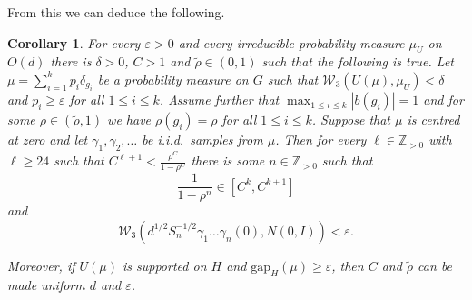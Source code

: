 \documentclass[10pt, english,oneside,reqno]{amsart}
\theoremstyle{plain}
\newtheorem{corollary}[theorem]{Corollary}
\theoremstyle{remark}
\numberwithin{equation}{section}
\numberwithin{figure}{section}
\newcommand{\eps}{\varepsilon}
\newcommand{\Z}{\mathbb{Z}}
\newcommand{\R}{\mathbb{R}}
\begin{document}
From this we can deduce the following.
\begin{corollary} \label{coro:many_bounded}
    For every $\varepsilon > 0$ and every irreducible probability measure $\mu_U$ on $O(d)$ there is $\delta > 0$,  $C>1$ and $\tilde{\rho} \in (0, 1)$ such that the following is true. Let $\mu = \sum_{i = 1}^k p_i\delta_{g_i}$ be a probability measure on $G$ such that $\mathcal{W}_3(U(\mu), \mu_U) < \delta$ and $p_i \geq \eps$ for all $1 \leq i \leq k$. Assume further that $\max_{1 \leq i \leq k} |b(g_i)| = 1$ and for some $\rho \in (\tilde{\rho},1)$ we have $\rho(g_i) = \rho$ for all $1\leq i \leq k$. Suppose that $\mu$ is centred at zero and let $\gamma_1, \gamma_2, \dots$ be i.i.d.\ samples from $\mu$. Then for every $\ell \in \Z_{>0}$ with $\ell \geq 24$ such that $C^{\ell+1} < \frac{\rho^{C}}{1 - \rho^{C}}$ there is some $n \in \Z_{>0}$ such that
    \begin{equation*}
        \frac{1}{1 - \rho^n} \in [C^{k}, C^{k+1}]
    \end{equation*}
    and
    \begin{equation*}
        \mathcal{W}_3(d^{1/2} S_n^{-1/2} \gamma_1 \dots \gamma_n(0), N(0, I)) < \varepsilon.
    \end{equation*}

    Moreover, if $U(\mu)$ is supported on $H$ and $\mathrm{gap}_H(\mu) \geq \eps$, then $C$ and $\tilde{\rho}$ can be made uniform $d$ and $\eps$.
\end{corollary}

\end{document}
